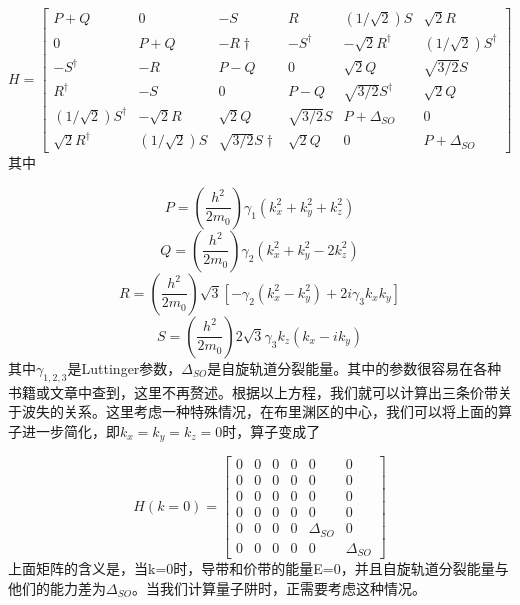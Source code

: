 \documentclass{ZJUthesis}
\begin{document}
\begin{equation}
    \label{eq_6times6}
    H = \left[\begin{array}{cccccc}P+Q & 0 & -S & R & (1/\sqrt{2})S & \sqrt{2}R \\0 & P+Q & -R\dag & -S^\dag & -\sqrt{2}R^\dag & (1/\sqrt{2})S^\dag \\-S^\dag & -R & P-Q & 0 & \sqrt{2}Q & \sqrt{3/2}S \\R^\dag & -S & 0 & P-Q & \sqrt{3/2}S^\dag & \sqrt{2}Q \\(1/\sqrt{2})S^\dag & -\sqrt{2}R & \sqrt{2}Q & \sqrt{3/2}S & P+\Delta_{SO} & 0 \\\sqrt{2}R^\dag & (1/\sqrt{2})S & \sqrt{3/2}S\dag & \sqrt{2}Q & 0 & P+\Delta_{SO}\end{array}\right]
\end{equation}
其中

\begin{equation}
    P = \left( \frac{h^2}{2m_0} \right) \gamma_1 (k^2_x + k^2_y + k^2_z)
\end{equation}
\begin{equation}
    Q = \left( \frac{h^2}{2m_0} \right) \gamma_2 (k^2_x + k^2_y - 2k^2_z)
\end{equation}
\begin{equation}
    R = \left( \frac{h^2}{2m_0} \right) \sqrt{3} [-\gamma_2 (k^2_x - k^2_y) + 2i \gamma_3 k_x k_y]
\end{equation}
\begin{equation}
    S = \left( \frac{h^2}{2m_0} \right) 2 \sqrt{3} \gamma_3 k_z (k_x - ik_y)
\end{equation}
其中$\gamma_{1,2,3}$是Luttinger参数，$\Delta_{SO}$是自旋轨道分裂能量。其中的参数很容易在各种书籍或文章中查到，这里不再赘述。根据以上方程，我们就可以计算出三条价带关于波失的关系。这里考虑一种特殊情况，在布里渊区的中心，我们可以将上面的算子进一步简化，即$k_x=k_y=k_z=0$时，算子变成了

\begin{equation}
    H(k=0) = \left[\begin{array}{cccccc}0 & 0 & 0 & 0 & 0 & 0 \\0 & 0 & 0 & 0 & 0 & 0 \\0 & 0 & 0 & 0 & 0 & 0 \\0 & 0 & 0 & 0 & 0 & 0 \\0 & 0 & 0 & 0 & \Delta_{SO} & 0 \\0 & 0 & 0 & 0 & 0 & \Delta_{SO}\end{array}\right]
\end{equation}
上面矩阵的含义是，当k=0时，导带和价带的能量E=0，并且自旋轨道分裂能量与他们的能力差为$\Delta_{SO}$。当我们计算量子阱时，正需要考虑这种情况。
\end{document}
